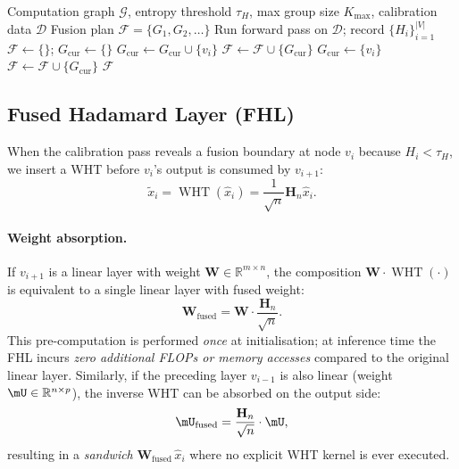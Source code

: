 \documentclass{article}
\newcommand{\mH}{\mathbf{H}}          %
\newcommand{\mW}{\mathbf{W}}          %
\newcommand{\RR}{\mathbb{R}}
\newcommand{\had}{\mathop{\mathrm{WHT}}\nolimits}  %
\begin{document}
\begin{algorithm}[tb]
  \caption{Entropy-Guided Fusion Scheduler (EGFS)}
  \label{alg:egfs}
  \begin{algorithmic}[1]
    \Require Computation graph $\mathcal{G}$, entropy threshold $\tau_H$,
             max group size $K_{\max}$, calibration data $\mathcal{D}$
    \Ensure Fusion plan $\mathcal{F} = \{G_1, G_2, \ldots\}$
    \State Run forward pass on $\mathcal{D}$; record $\{H_i\}_{i=1}^{|V|}$
    \State $\mathcal{F} \leftarrow \{\}$; $G_{\text{cur}} \leftarrow \{\}$
        \State $G_{\text{cur}} \leftarrow G_{\text{cur}} \cup \{v_i\}$
      \Else
          $\mathcal{F} \leftarrow \mathcal{F} \cup \{G_{\text{cur}}\}$
        \EndIf
        \State $G_{\text{cur}} \leftarrow \{v_i\}$
      \EndIf
    \EndFor
      $\mathcal{F} \leftarrow \mathcal{F} \cup \{G_{\text{cur}}\}$
    \EndIf
    \State \Return $\mathcal{F}$
  \end{algorithmic}
\end{algorithm}

\subsection{Fused Hadamard Layer (FHL)}
\label{sec:method:fhl}

When the calibration pass reveals a fusion boundary at node $v_i$ because
$H_i < \tau_H$, we insert a WHT before $v_i$'s output is consumed by $v_{i+1}$:
\begin{equation}
  \tilde{x}_i = \had(\hat{x}_i) = \frac{1}{\sqrt{n}} \mH_n \hat{x}_i.
  \label{eq:wht-insertion}
\end{equation}

\paragraph{Weight absorption.}
If $v_{i+1}$ is a linear layer with weight $\mW \in \RR^{m \times n}$, the
composition $\mW \cdot \had(\cdot)$ is equivalent to a single linear layer
with fused weight:
\begin{equation}
  \mW_{\mathrm{fused}} = \mW \cdot \frac{\mH_n}{\sqrt{n}}.
  \label{eq:weight-absorption}
\end{equation}
This pre-computation is performed \emph{once} at initialisation; at inference
time the FHL incurs \emph{zero additional FLOPs or memory accesses} compared
to the original linear layer.  Similarly, if the preceding layer $v_{i-1}$
is also linear (weight $\mU \in \RR^{n \times p}$), the inverse WHT can be
absorbed on the output side:
\begin{equation}
  \mU_{\mathrm{fused}} = \frac{\mH_n}{\sqrt{n}} \cdot \mU,
  \label{eq:output-absorption}
\end{equation}
resulting in a \emph{sandwich} $\mW_{\mathrm{fused}} \, \hat{x}_i$ where no
explicit WHT kernel is ever executed.
\end{document}
